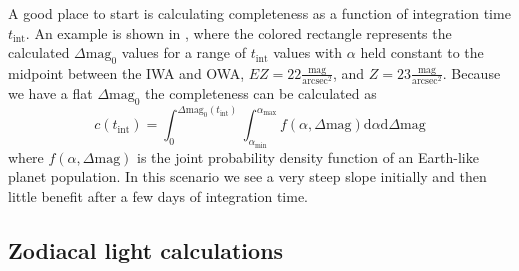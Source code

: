 A good place to start is calculating completeness
as a function of integration time $t_\textrm{int}$. An example
is shown in , where the colored rectangle
represents the calculated $\Delta\textrm{mag}_0$ values for a range of
$t_\textrm{int}$ values with $\alpha$ held constant to the midpoint between
the IWA and OWA, $EZ=22 \frac{\textrm{mag}}{\textrm{arcsec}^2}$, and
$Z=23 \frac{\textrm{mag}}{\textrm{arcsec}^2}$. Because we have a
flat $\Delta\textrm{mag}_0$ the completeness can be calculated as
\begin{equation}
  c(t_\textrm{int}) = \int_{0}^{\Delta\textrm{mag}_0(t_\textrm{int})} 
  \int_{\alpha_\textrm{min}}^{\alpha_\textrm{max}} 
  f(\alpha, \Delta\textrm{mag})\textrm{d}\alpha \textrm{d}\Delta\textrm{mag}
  \label{eq:flat_comp_integral}
\end{equation}
where $f(\alpha, \Delta\textrm{mag})$ is the joint probability density function 
of an Earth-like planet population. In this scenario we see a very steep slope
initially and then little benefit after a few days of integration time.




\subsection{Zodiacal light calculations}
\label{sub:zodi}

